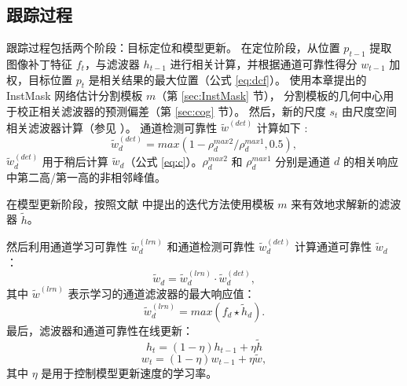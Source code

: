 \subsection{跟踪过程}
跟踪过程包括两个阶段：目标定位和模型更新。
在定位阶段，从位置 $p_{t-1}$ 提取图像补丁特征 $f_t$，与滤波器 $h_{t-1}$ 进行相关计算，并根据通道可靠性得分 $w_{t-1}$ 加权，目标位置 $p_t$ 是相关结果的最大位置（公式 \ref{eq:dcf}）。
使用本章提出的 InstMask 网络估计分割模板 $m$（第 \ref{sec:InstMask} 节），
分割模板的几何中心用于校正相关滤波器的预测偏差（第 \ref{sec:cog} 节）。
然后，新的尺度 $s_t$ 由尺度空间相关滤波器计算（参见 \cite{Danelljan2014AccurateSE}）。
通道检测可靠性 $\tilde{w}^{(det)}$ 计算如下 \cite{Lukezic2017DiscriminativeCF}:
\begin{equation} \label{eq:det}
\tilde w_d^{(det)} = max(1 - \rho_d^{max2} / \rho_d^{max1}, 0.5),
\end{equation}
$\tilde w_d^{(det)}$ 用于稍后计算 $\tilde w_d$（公式 \ref{eq:c}）。$\rho_d^{max2}$ 和 $\rho_d^{max1}$ 分别是通道 $d$ 的相关响应中第二高/第一高的非相邻峰值。

在模型更新阶段，按照文献 \cite{Lukezic2017DiscriminativeCF} 中提出的迭代方法使用模板 $m$ 来有效地求解新的滤波器 $\tilde{h}$。

然后利用通道学习可靠性 $\tilde w_d^{(lrn)}$ 和通道检测可靠性 $\tilde w_d^{(det)}$ 计算通道可靠性 $\tilde w_d$ \cite{Lukezic2017DiscriminativeCF}：
\begin{equation} \label{eq:c}
\tilde w_d = \tilde w_d^{(lrn)} \cdot \tilde w_d^{(det)},
\end{equation}
其中 $\tilde{w}^{(lrn)}$ 表示学习的通道滤波器的最大响应值：
\begin{equation} \label{eq:lrn}
\tilde{w}_d^{(lrn)} = max(f_d \star \tilde h_d).
\end{equation}
最后，滤波器和通道可靠性在线更新：\begin{equation} \label{eq:update1}
h_t = (1 - \eta)h_{t-1} + \eta \tilde{h}
\end{equation}
\begin{equation} \label{eq:update2}
w_t = (1-\eta)w_{t-1} + \eta \tilde{w},
\end{equation}
其中 $\eta$ 是用于控制模型更新速度的学习率。

